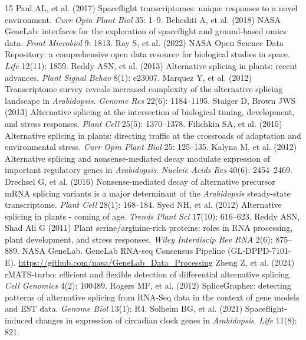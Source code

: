\documentclass[12pt,a4paper]{article}
\begin{document}
\begin{thebibliography}{15}
 Paul AL, et al. (2017) Spaceflight transcriptomes: unique responses to a novel environment. \textit{Curr Opin Plant Biol} 35: 1--9.
 Beheshti A, et al. (2018) NASA GeneLab: interfaces for the exploration of spaceflight and ground-based omics data. \textit{Front Microbiol} 9: 1813.
 Ray S, et al. (2022) NASA Open Science Data Repository: a comprehensive open data resource for biological studies in space. \textit{Life} 12(11): 1859.
 Reddy ASN, et al. (2013) Alternative splicing in plants: recent advances. \textit{Plant Signal Behav} 8(1): e23007.
 Marquez Y, et al. (2012) Transcriptome survey reveals increased complexity of the alternative splicing landscape in \textit{Arabidopsis}. \textit{Genome Res} 22(6): 1184--1195.
 Staiger D, Brown JWS (2013) Alternative splicing at the intersection of biological timing, development, and stress responses. \textit{Plant Cell} 25(5): 1370--1378.
 Filichkin SA, et al. (2015) Alternative splicing in plants: directing traffic at the crossroads of adaptation and environmental stress. \textit{Curr Opin Plant Biol} 25: 125--135.
 Kalyna M, et al. (2012) Alternative splicing and nonsense-mediated decay modulate expression of important regulatory genes in \textit{Arabidopsis}. \textit{Nucleic Acids Res} 40(6): 2454--2469.
 Drechsel G, et al. (2016) Nonsense-mediated decay of alternative precursor mRNA splicing variants is a major determinant of the \textit{Arabidopsis} steady-state transcriptome. \textit{Plant Cell} 28(1): 168--184.
 Syed NH, et al. (2012) Alternative splicing in plants - coming of age. \textit{Trends Plant Sci} 17(10): 616--623.
 Reddy ASN, Shad Ali G (2011) Plant serine/arginine-rich proteins: roles in RNA processing, plant development, and stress responses. \textit{Wiley Interdiscip Rev RNA} 2(6): 875--889.
 NASA GeneLab. GeneLab RNA-seq Consensus Pipeline (GL-DPPD-7101-E). \url{https://github.com/nasa/GeneLab_Data_Processing}
 Zheng Z, et al. (2024) rMATS-turbo: efficient and flexible detection of differential alternative splicing. \textit{Cell Genomics} 4(2): 100489.
 Rogers MF, et al. (2012) SpliceGrapher: detecting patterns of alternative splicing from RNA-Seq data in the context of gene models and EST data. \textit{Genome Biol} 13(1): R4.
 Solheim BG, et al. (2021) Spaceflight-induced changes in expression of circadian clock genes in \textit{Arabidopsis}. \textit{Life} 11(8): 821.
\end{thebibliography}
\end{document}
